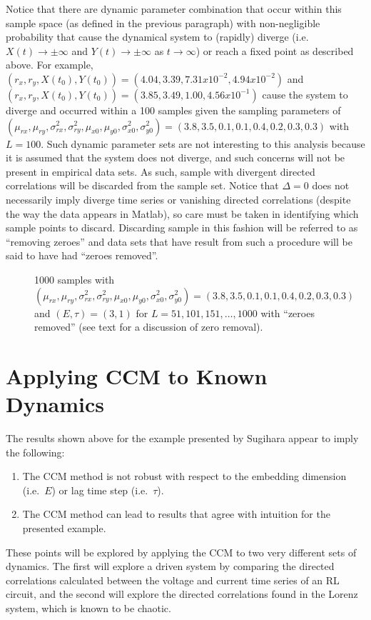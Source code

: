 \documentclass[a4paper,11pt]{article}
\begin{document}
Notice that there are dynamic parameter combination that occur within this sample space (as defined in the previous paragraph) with non-negligible probability that cause the dynamical system to (rapidly) diverge (i.e.\ $X(t)\rightarrow \pm \infty$ and $Y(t)\rightarrow \pm \infty$ as $t\rightarrow\infty$) or reach a fixed point as described above.  For example, $\left(r_x,r_y,X(t_0),Y(t_0)\right) = \left(4.04,3.39,7.31x10^{-2},4.94x10^{-2}\right)$ and $\left(r_x,r_y,X(t_0),Y(t_0)\right) = \left(3.85,3.49,1.00,4.56x10^{-1}\right)$ cause the system to diverge and occurred within a 100 samples given the sampling parameters of $\left(\mu_{rx},\mu_{ry},\sigma^2_{rx},\sigma^2_{ry},\mu_{x0},\mu_{y0},\sigma^2_{x0},\sigma^2_{y0}\right) = \left(3.8,3.5,0.1,0.1,0.4,0.2,0.3,0.3\right)$ with $L=100$.  Such dynamic parameter sets are not interesting to this analysis because it is assumed that the system does not diverge, and such concerns will not be present in empirical data sets.  As such, sample with divergent directed correlations will be discarded from the sample set.  Notice that $\Delta=0$ does not necessarily imply diverge time series or vanishing directed correlations (despite the way the data appears in Matlab), so care must be taken in identifying which sample points to discard.  Discarding sample in this fashion will be referred to as ``removing zeroes'' and data sets that have result from such a procedure will be said to have had ``zeroes removed''.

\begin{figure}[h!t]
\centering
\label{fig:TwoPopDynSampFig1}
\caption{1000 samples with $\left(\mu_{rx},\mu_{ry},\sigma^2_{rx},\sigma^2_{ry},\mu_{x0},\mu_{y0},\sigma^2_{x0},\sigma^2_{y0}\right) = \left(3.8,3.5,0.1,0.1,0.4,0.2,0.3,0.3\right)$ and $\left(E,\tau\right)=\left(3,1\right)$ for $L=51, 101, 151, \ldots, 1000$ with ``zeroes removed'' (see text for a discussion of zero removal).}
\end{figure}


\section{Applying CCM to Known Dynamics}
The results shown above for the example presented by Sugihara appear to imply the following:
\begin{enumerate}
\item The CCM method is not robust with respect to the embedding dimension (i.e.\ $E$) or lag time step (i.e.\ $\tau$).
\item The CCM method can lead to results that agree with intuition for the presented example. 
\end{enumerate}
These points will be explored by applying the CCM to two very different sets of dynamics.  The first will explore a driven system by comparing the directed correlations calculated between the voltage and current time series of an RL circuit, and the second will explore the directed correlations found in the Lorenz system, which is known to be chaotic.
\end{document}
